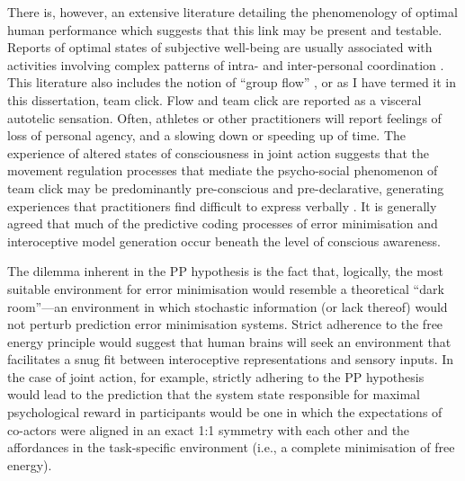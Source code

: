 \begin{CJK}{UTF8}{gbsn}
{There is, however, an extensive literature detailing the phenomenology of optimal human performance which suggests that this link may be present and testable.  Reports of optimal states of subjective well-being are usually associated with activities involving complex patterns of intra- and inter-personal coordination \citep{Jackson1996}. This literature also includes the notion of ``group flow'' \citep{Sawyer2006,Noy2015}, or as I have termed it in this dissertation, team click.  Flow and team click are reported as a visceral autotelic sensation.  Often, athletes or other practitioners will report feelings of loss of personal agency, and a slowing down or speeding up of time.  The experience of altered states of consciousness in joint action suggests that the movement regulation processes that mediate the psycho-social phenomenon of team click may be predominantly pre-conscious and pre-declarative, generating experiences that practitioners find difficult to express verbally \citep{Jackson1996,Semin2008,Rufi2015}. It is generally agreed that much of the predictive coding processes of error minimisation and interoceptive model generation occur beneath the level of conscious awareness\citep{Frith2007,Clark2013}.


The dilemma inherent in the PP hypothesis is the fact that, logically, the most suitable environment for error minimisation would resemble a theoretical ``dark room''---an environment in which stochastic information (or lack thereof) would not perturb prediction error minimisation systems\citep{Little2013}.  Strict adherence to the free energy principle would suggest that human brains will seek an environment that facilitates a snug fit between interoceptive representations and sensory inputs.  In the case of joint action, for example, strictly adhering to the PP hypothesis would lead to the prediction that the system state responsible for maximal psychological reward in participants would be one in which the expectations of co-actors were aligned in an exact 1:1 symmetry with each other and the affordances in the task-specific environment (i.e., a complete minimisation of free energy).

}
\end{CJK}
